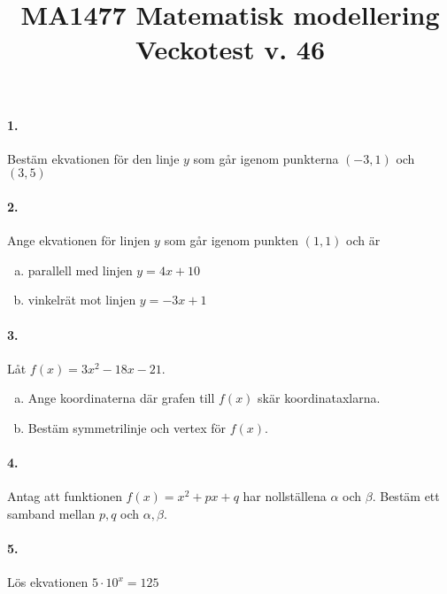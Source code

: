 \documentclass[a4paper]{article}
\title{\bf MA1477 Matematisk modellering \\[10pt]  Veckotest v.
  46}
\date{}
\begin{document}
\maketitle

\paragraph{1.} Bestäm ekvationen för den linje $y$ som går igenom
punkterna $(-3,1)$ och $(3,5)$
\paragraph{2.} Ange ekvationen för linjen $y$ som går igenom punkten
$(1,1)$ och är
\begin{enumerate}[(a)]
\item parallell med linjen $y = 4x +10$
\item vinkelrät mot linjen $y = -3x +1$
\end{enumerate}
\paragraph{3.} Låt $f(x) = 3x^2-18x-21$.
\begin{enumerate}[(a)]
\item Ange koordinaterna där grafen till $f(x)$ skär koordinataxlarna.
\item Bestäm symmetrilinje och vertex för $f(x)$.
\end{enumerate}
\paragraph{4.} Antag att funktionen $f(x) = x^2 + px +q$ har
nollställena $\alpha$ och $\beta$. Bestäm ett samband mellan $p,q$ och
$\alpha, \beta$.

\paragraph{5.} Lös ekvationen $5\cdot 10^x = 125$
\end{document}
